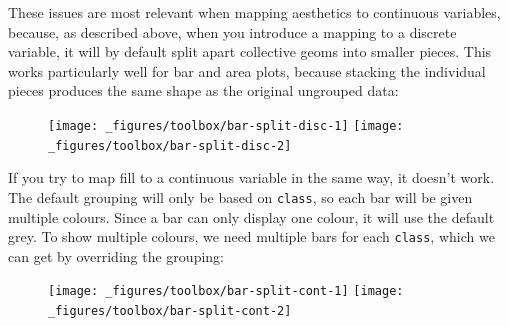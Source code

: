 These issues are most relevant when mapping aesthetics to continuous
variables, because, as described above, when you introduce a mapping to
a discrete variable, it will by default split apart collective geoms
into smaller pieces. This works particularly well for bar and area
plots, because stacking the individual pieces produces the same shape as
the original ungrouped data:

\begin{Shaded}
\begin{Highlighting}[]
\StringTok{ }
\StringTok{  }\NormalTok{()}
 \StringTok{ }
\StringTok{  }\NormalTok{()}
\end{Highlighting}
\end{Shaded}

\begin{figure}[H]
  \texttt{[image: \_figures/toolbox/bar-split-disc-1]}%
  \texttt{[image: \_figures/toolbox/bar-split-disc-2]}
\end{figure}

If you try to map fill to a continuous variable in the same way, it
doesn't work. The default grouping will only be based on \texttt{class},
so each bar will be given multiple colours. Since a bar can only display
one colour, it will use the default grey. To show multiple colours, we
need multiple bars for each \texttt{class}, which we can get by
overriding the grouping:

\begin{Shaded}
\begin{Highlighting}[]
 \StringTok{ }
\StringTok{  }\NormalTok{()}
  \StringTok{ }
\StringTok{  }\NormalTok{()}
\end{Highlighting}
\end{Shaded}

\begin{figure}[H]
  \texttt{[image: \_figures/toolbox/bar-split-cont-1]}%
  \texttt{[image: \_figures/toolbox/bar-split-cont-2]}
\end{figure}

